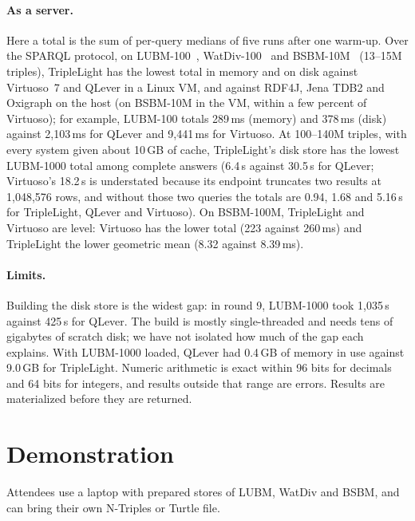 \documentclass[sigconf,nonacm]{acmart}
\newcommand{\sys}{TripleLight}
\begin{document}
\paragraph{As a server.} Here a total is the sum of per-query medians of five runs after one warm-up. Over the SPARQL protocol, on LUBM-100~\cite{lubm}, WatDiv-100~\cite{watdiv} and BSBM-10M~\cite{bsbm} (13--15M triples), \sys{} has the
lowest total in memory and on disk against Virtuoso~7 and QLever in a Linux VM, and against RDF4J, Jena TDB2 and
Oxigraph on the host (on BSBM-10M in the VM, within a few percent of Virtuoso); for example, LUBM-100 totals 289\,ms (memory) and 378\,ms (disk) against 2,103\,ms for QLever
and 9,441\,ms for Virtuoso. At 100--140M triples, with every system given about 10\,GB of cache, \sys{}'s disk store
has the lowest LUBM-1000 total among complete answers (6.4\,s against 30.5\,s for QLever; Virtuoso's 18.2\,s is
understated because its endpoint truncates two results at 1,048,576 rows, and without those two queries the totals are
0.94, 1.68 and 5.16\,s for \sys{}, QLever and Virtuoso). On BSBM-100M, \sys{} and Virtuoso are level: Virtuoso has
the lower total (223 against 260\,ms) and \sys{} the lower geometric mean (8.32 against 8.39\,ms).

\paragraph{Limits.} Building the disk store is the widest gap: in round 9, LUBM-1000 took 1,035\,s against 425\,s for
QLever. The build is mostly single-threaded and needs tens of gigabytes of scratch disk; we have not isolated how much
of the gap each explains. With LUBM-1000 loaded, QLever had 0.4\,GB of memory in use against 9.0\,GB for \sys{}. Numeric arithmetic is exact within 96 bits for decimals and 64 bits for
integers, and results outside that range are errors. Results are materialized before they are returned.

\section{Demonstration}
\label{sec:demo}

Attendees use a laptop with prepared stores of LUBM, WatDiv and BSBM, and can bring their own N-Triples or Turtle file.
\end{document}
